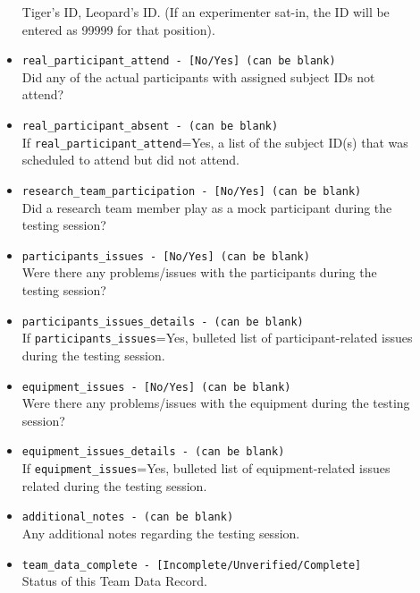 \begin{description}
\begin{itemize}
        Tiger's ID, Leopard's ID. (If an experimenter sat-in, the ID will be
        entered as 99999 for that position).
    \item \verb|real_participant_attend - [No/Yes] (can be blank)|\\
		Did any of the actual participants with assigned subject IDs not attend?
    \item \verb|real_participant_absent - (can be blank)|\\
        If \verb|real_participant_attend|=Yes, a list of the subject ID(s) that
        was scheduled to attend but did not attend.
    \item \verb|research_team_participation - [No/Yes] (can be blank)|\\
		Did a research team member play as a mock participant during the testing session?
    \item \verb|participants_issues - [No/Yes] (can be blank)|\\
		Were there any problems/issues with the participants during the testing session?
    \item \verb|participants_issues_details - (can be blank)|\\
        If \verb|participants_issues|=Yes, bulleted list of participant-related
        issues during the testing session.
    \item \verb|equipment_issues - [No/Yes] (can be blank)|\\
		Were there any problems/issues with the equipment during the testing session?
    \item \verb|equipment_issues_details - (can be blank)|\\
        If \verb|equipment_issues|=Yes, bulleted list of equipment-related
        issues related during the testing session.
    \item \verb|additional_notes - (can be blank)|\\
        Any additional notes regarding the testing session.
    \item \verb|team_data_complete - [Incomplete/Unverified/Complete]|\\
        Status of this Team Data Record.
\end{itemize}


\end{description}
